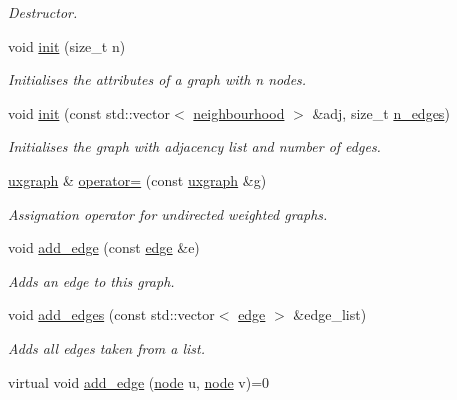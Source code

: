 \begin{DoxyCompactItemize}
\begin{DoxyCompactList}\small\item\em Destructor. \end{DoxyCompactList}\item 
void \hyperlink{classlgraph_1_1uxgraph_a539e735d68b55ce01d733262c9db34d5}{init} (size\-\_\-t n)
\begin{DoxyCompactList}\small\item\em Initialises the attributes of a graph with {\itshape n} nodes. \end{DoxyCompactList}\item 
void \hyperlink{classlgraph_1_1uxgraph_ab0e84975aa8048e6d93622d1b4e0c567}{init} (const std\-::vector$<$ \hyperlink{namespacelgraph_a052e7766c13f3a43cec0aec8173fdede}{neighbourhood} $>$ \&adj, size\-\_\-t \hyperlink{classlgraph_1_1xxgraph_a8ca991d1521cb6ba77e1cd3494ab42be}{n\-\_\-edges})
\begin{DoxyCompactList}\small\item\em Initialises the graph with adjacency list and number of edges. \end{DoxyCompactList}\item 
\hyperlink{classlgraph_1_1uxgraph}{uxgraph} \& \hyperlink{classlgraph_1_1uxgraph_ac46d439a1620885943a55a3338f9474f}{operator=} (const \hyperlink{classlgraph_1_1uxgraph}{uxgraph} \&g)
\begin{DoxyCompactList}\small\item\em Assignation operator for undirected weighted graphs. \end{DoxyCompactList}\item 
void \hyperlink{classlgraph_1_1uxgraph_a1a826ff50563bc4021e16d712f309232}{add\-\_\-edge} (const \hyperlink{namespacelgraph_a76bd7d50719f03de7a85db259d80d572}{edge} \&e)
\begin{DoxyCompactList}\small\item\em Adds an edge to this graph. \end{DoxyCompactList}\item 
void \hyperlink{classlgraph_1_1uxgraph_ad20f841d6bb1147d087546c6054c55f3}{add\-\_\-edges} (const std\-::vector$<$ \hyperlink{namespacelgraph_a76bd7d50719f03de7a85db259d80d572}{edge} $>$ \&edge\-\_\-list)
\begin{DoxyCompactList}\small\item\em Adds all edges taken from a list. \end{DoxyCompactList}\item 
virtual void \hyperlink{classlgraph_1_1uxgraph_a5cf2ae9cf398b712fb9fe080b6976587}{add\-\_\-edge} (\hyperlink{namespacelgraph_a397169dd66adf725210a30fb7251773e}{node} u, \hyperlink{namespacelgraph_a397169dd66adf725210a30fb7251773e}{node} v)=0

\end{DoxyCompactItemize}
